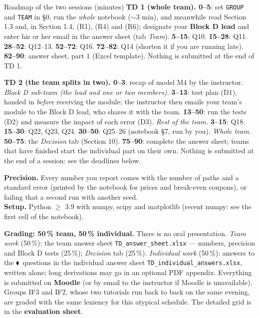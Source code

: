\documentclass[11pt,a4paper]{article}
\newcommand{\indiv}{\textcolor{indivred}{$\blacklozenge$}}
\begin{document}
\begin{navybox}{Roadmap of the two sessions (minutes)}
\small
\textbf{TD 1 (whole team). 0--5}: set \texttt{GROUP} and \texttt{TEAM} in \S0, run the \emph{whole} notebook ($\sim$3 min), and meanwhile
read Section 1.3 and, in Section 1.4, (R1), (R4) and (R6); designate your \textbf{Block D lead} and enter his
or her email in the answer sheet (tab \emph{Team}). \textbf{5--15}: Q10. \textbf{15--28}: Q11. \textbf{28--52}: Q12--13. \textbf{52--72}: Q16.
\textbf{72--82}: Q14 (shorten it if you are running late). \textbf{82--90}: answer sheet, part 1 (Excel template). Nothing is
submitted at the end of TD 1.

\textbf{TD 2 (the team splits in two). 0--3}: recap of model M4 by the instructor. \emph{Block D sub-team (the lead
and one or two members).} \textbf{3--13}: test plan (D1), handed in \emph{before} receiving the module; the instructor then
emails your team's module to the Block D lead, who shares it with the team. \textbf{13--50}: run the tests (D2)
and measure the impact of each error (D3). \emph{Rest of the team.} \textbf{3--15}: Q18. \textbf{15--30}: Q22, Q23, Q24. \textbf{30--50}:
Q25--26 (notebook \S7, run by you). \emph{Whole team.} \textbf{50--75}: the \emph{Decision} tab (Section 10). \textbf{75--90}: complete
the answer sheet; teams that have finished start the individual part on their own. Nothing is submitted at
the end of a session: see the deadlines below.

\textbf{Precision.} Every number you report comes with the number of paths and a standard error (printed by
the notebook for prices and break-even coupons), or failing that a second run with another seed.\\
\textbf{Setup.} Python $\geq$ 3.9 with numpy, scipy and matplotlib (recent numpy: see the first cell of the notebook).
\end{navybox}

\noindent\textbf{Grading: 50\,\% team, 50\,\% individual.} There is no oral presentation. \emph{Team work} (50\,\%): the
team answer sheet \texttt{TD\_answer\_sheet.xlsx} --- numbers, precision and Block D tests (25\,\%); \emph{Decision} tab (25\,\%). \emph{Individual work} (50\,\%): answers to the \indiv\ questions in the individual answer
sheet \texttt{TD\_individual\_answers.xlsx}, written alone; long derivations may go in an optional PDF appendix.
Everything is submitted on \textbf{Moodle} (or by email to the instructor if Moodle is unavailable). Groups
IF3 and IF2, whose two tutorials run back to back on the same evening, are graded with the same
leniency for this atypical schedule. The detailed grid is in the \textbf{evaluation sheet}.
\end{document}
